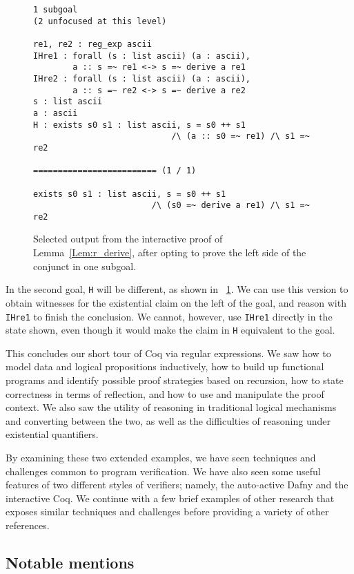 \begin{figure}[ht]
\begin{verbatim}
1 subgoal
(2 unfocused at this level)

re1, re2 : reg_exp ascii
IHre1 : forall (s : list ascii) (a : ascii),
        a :: s =~ re1 <-> s =~ derive a re1
IHre2 : forall (s : list ascii) (a : ascii),
        a :: s =~ re2 <-> s =~ derive a re2
s : list ascii
a : ascii
H : exists s0 s1 : list ascii, s = s0 ++ s1
                            /\ (a :: s0 =~ re1) /\ s1 =~ re2

========================= (1 / 1)

exists s0 s1 : list ascii, s = s0 ++ s1
                        /\ (s0 =~ derive a re1) /\ s1 =~ re2
\end{verbatim}
\caption{Selected output from the interactive proof of Lemma~\ref{Lem:r_derive},
    after opting to prove the left side of the conjunct in one
    subgoal.}\label{F:r_derive2}
\end{figure}

In the second goal, \texttt{H} will be different, as shown in
\figurename~\ref{F:r_derive2}. We can use this version to obtain witnesses for
the existential claim on the left of the goal, and reason with \texttt{IHre1} to
finish the conclusion. We cannot, however, use \texttt{IHre1} directly in the
state shown, even though it would make the claim in \texttt{H} equivalent to the
goal.

This concludes our short tour of Coq via regular expressions. We saw how to
model data and logical propositions inductively, how to build up functional
programs and identify possible proof strategies based on recursion, how to state
correctness in terms of reflection, and how to use and manipulate the proof
context. We also saw the utility of reasoning in traditional logical mechanisms
and converting between the two, as well as the difficulties of reasoning under
existential quantifiers.

By examining these two extended examples, we have seen techniques and challenges
common to program verification. We have also seen some useful features of two
different styles of verifiers; namely, the auto-active Dafny and the interactive
Coq. We continue with a few brief examples of other research that exposes
similar techniques and challenges before providing a variety of other
references.

\subsection{Notable mentions}\label{S:ex_notable}

